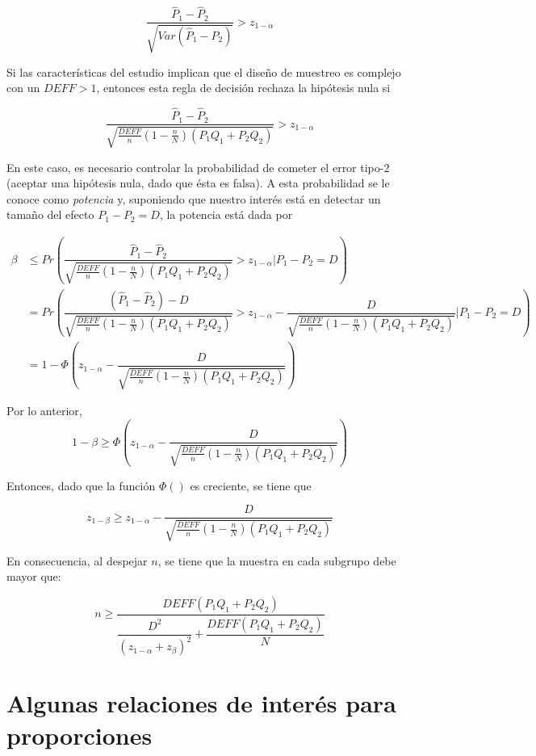 \documentclass[
  12pt,
  spanish,
]{book}
\begin{document}
\[
\dfrac{\hat{P}_1-\hat{P}_2}{\sqrt{Var(\hat{P}_1-\hat{P}_2)}} > z_{1-\alpha}
\]

Si las características del estudio implican que el diseño de muestreo es complejo con un \(DEFF > 1\), entonces esta regla de decisión rechaza la hipótesis nula si

\[
\dfrac{\hat{P}_1-\hat{P}_2}{\sqrt{\frac{DEFF}{n}\left(1-\frac{n}{N}\right)(P_1Q_1+P_2Q_2)}} > z_{1-\alpha}
\]

En este caso, es necesario controlar la probabilidad de cometer el error tipo-2 (aceptar una hipótesis nula, dado que ésta es falsa). A esta probabilidad se le conoce como \emph{potencia} y, suponiendo que nuestro interés está en detectar un tamaño del efecto \(P_1 -P_2 =D\), la potencia está dada por

\begin{align*}
\beta &\leq Pr\left(\dfrac{\hat{P}_1-\hat{P}_2}{\sqrt{\frac{DEFF}{n}\left(1-\frac{n}{N}\right)(P_1Q_1+P_2Q_2)}} > z_{1-\alpha} \left. | \right. P_1 -P_2 =D \right)\\
&= Pr\left(\dfrac{(\hat{P}_1-\hat{P}_2)-D}{\sqrt{\frac{DEFF}{n}\left(1-\frac{n}{N}\right)(P_1Q_1+P_2Q_2)}} > z_{1-\alpha} - \dfrac{D}{\sqrt{\frac{DEFF}{n}\left(1-\frac{n}{N}\right)(P_1Q_1+P_2Q_2)}} | P_1 -P_2 =D
\right)\\
&= 1-\Phi\left(z_{1-\alpha} - \dfrac{D}{\sqrt{\frac{DEFF}{n}\left(1-\frac{n}{N}\right)(P_1Q_1+P_2Q_2)}} \right)
\end{align*}

Por lo anterior,
\[
1-\beta \geq \Phi\left(z_{1-\alpha} - \dfrac{D}{\sqrt{\frac{DEFF}{n}\left(1-\frac{n}{N}\right)(P_1Q_1+P_2Q_2)}} \right)
\]

Entonces, dado que la función \(\Phi()\) es creciente, se tiene que

\[
z_{1-\beta} \geq z_{1-\alpha} - \dfrac{D}{\sqrt{\frac{DEFF}{n}\left(1-\frac{n}{N}\right)(P_1Q_1+P_2Q_2)}} 
\]

En consecuencia, al despejar \(n\), se tiene que la muestra en cada subgrupo debe mayor que:

\[
n \geq \dfrac{DEFF(P_1Q_1+P_2Q_2)}{\dfrac{D^2}{(z_{1-\alpha}+z_{\beta})^2}+\dfrac{DEFF(P_1Q_1+P_2Q_2)}{N}}
\]

\hypertarget{algunas-relaciones-de-interuxe9s-para-proporciones}{%
\section{Algunas relaciones de interés para proporciones}\label{algunas-relaciones-de-interuxe9s-para-proporciones}}
\end{document}
